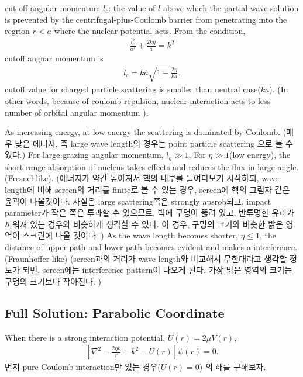 \documentclass[10pt]{book}
\newcommand{\bea}{\begin{eqnarray}}
\newcommand{\eea}{\end{eqnarray}}
\begin{document}
cut-off angular momentum $l_c$: the value of $l$ above which the partial-wave 
solution is prevented by the centrifugal-plus-Coulomb barrier from 
penetrating into the regrion $r<a$ where the nuclear potential acts. 
From the condition, 
\bea 
\frac{l_c^2}{a^2}+\frac{2k\eta}{a}=k^2
\eea 
cutoff anguar momentum is 
\bea 
l_c = k a \sqrt{1-\frac{2\eta}{ka}}.
\eea 
cutoff value for charged particle scattering is smaller than 
neutral case($ka$). (In other words, because of coulomb repulsion, 
nuclear interaction acts to less number of orbital angular momentum ). 

 
As increasing energy, at low energy the scattering is dominated by Coulomb.
(매우 낮은 에너지, 즉 large wave length의 경우는 point particle scattering 으로 
볼 수 있다.)
For large grazing angular momentum, $l_g\gg 1$,
For $\eta\gg 1$(low energy), the short range absorption of nucleus takes effects and 
reduces the flux in large angle.(Fresnel-like). 
(에너지가 약간 높아져서 핵의 내부를 들여다보기 시작하되,
wave length에 비해 screen의 거리를 finite로 볼 수 있는 경우,
screen에 핵의 그림자 같은 윤곽이 나올것이다. 사실은 large scattering쪽은 strongly 
apsrob되고, impact parameter가 작은 쪽은 투과할 수 있으므로,
벽에 구멍이 뚫려 있고, 반투명한 유리가 끼워져 있는 경우와 비슷하게 생각할 수 있다. 
이 경우, 구멍의 크기와 비슷한 밝은 영역이 스크린에 나올 것이다. 
)
As the wave length becomes shorter, $\eta\le 1$,
the distance of upper path and lower path becomes evident and 
 makes a interference.(Fraunhoffer-like)    
(screen과의 거리가 wave length와 비교해서 
무한대라고 생각할 정도가 되면, screen에는 interference pattern이 나오게 된다.  
가장 밝은 영역의 크기는 구멍의 크기보다 작아진다. 
)
\subsection{Full Solution: Parabolic Coordinate}
When there is a strong interaction potential, $U(r)=2\mu V(r)$,
\bea
\left[\nabla^2-\frac{2\eta k}{r}+k^2-U(r)\right] \psi(r)=0.
\eea
먼저 pure Coulomb interaction만 있는 경우($U(r)=0$)
의 해를 구해보자. 
\end{document}
